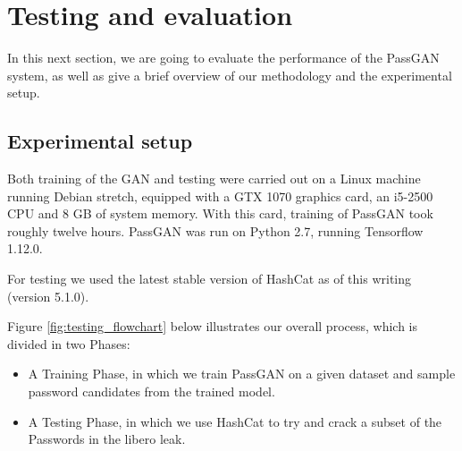 \section{Testing and evaluation}


In this next section, we are going to evaluate the performance of the PassGAN system, as well as give a brief overview of our methodology and the experimental setup.

\subsection{Experimental setup}
Both training of the GAN and testing were carried out on a Linux machine running Debian stretch, equipped with a GTX 1070 graphics card, an i5-2500 CPU and 8 GB of system memory. 
With this card, training of PassGAN took roughly twelve hours.
PassGAN was run on Python 2.7, running Tensorflow 1.12.0.%

For testing we used the latest stable version of HashCat as of this writing (version 5.1.0). %

Figure \ref{fig:testing_flowchart} below illustrates our overall process, which is divided in two Phases: 
\begin{itemize}
    \item A Training Phase, in which we train PassGAN on a given dataset and sample password candidates from the trained model.
    \item A Testing Phase, in which we use HashCat to try and crack a subset of the Passwords in the libero leak.
\end{itemize}

